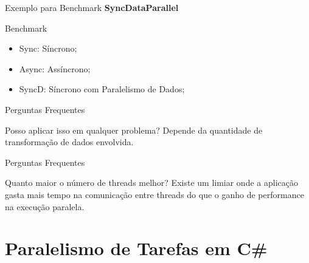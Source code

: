 \documentclass[10pt]{beamer}
\begin{document}
\begin{frame}{Exemplo para Benchmark}
	\textbf{SyncDataParallel}
\end{frame}

\begin{frame}{Benchmark}
	\begin{figure}
	\end{figure}
	\vspace{-0.5cm}
	\scriptsize
	\begin{itemize}
		\item Sync: Síncrono;
		\item Async: Assíncrono;
		\item SyncD: Síncrono com Paralelismo de Dados;
	\end{itemize}
\end{frame}

\begin{frame}{Perguntas Frequentes}
	\begin{exampleblock}{Posso aplicar isso em qualquer problema?}
		Depende da quantidade de transformação de dados envolvida.
	\end{exampleblock}
\end{frame}

\begin{frame}{Perguntas Frequentes}
	\begin{exampleblock}{Quanto maior o número de threads melhor?}
		Existe um limiar onde a aplicação gasta mais tempo na comunicação entre threads do que o ganho de performance na execução paralela.
	\end{exampleblock}
\end{frame}

\section{Paralelismo de Tarefas em C\#}
\end{document}
